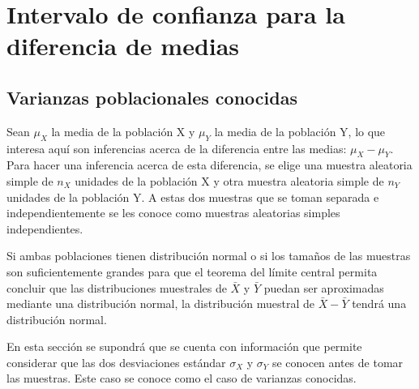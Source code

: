 \documentclass[
  11pt,
]{book}
\theoremstyle{definition}
\theoremstyle{definition}
\theoremstyle{definition}
\theoremstyle{definition}
\theoremstyle{remark}
\begin{document}
\section{Intervalo de confianza para la diferencia de medias}\label{intervalo-de-confianza-para-la-diferencia-de-medias}

\subsection{Varianzas poblacionales conocidas}\label{intervalo-de-confianza-para-la-diferencia-de-medias-varianzas-conocidas}

Sean \(\mu_X\) la media de la población X y \(\mu_Y\) la media de la población Y, lo que interesa aquí son inferencias acerca de la diferencia entre las medias: \(\mu_X - \mu_Y\). Para hacer una inferencia acerca de esta diferencia, se elige una muestra aleatoria simple de \(n_X\) unidades de la población X y otra muestra aleatoria simple de \(n_Y\) unidades de la población Y. A estas dos muestras que se toman separada e independientemente se les conoce como muestras aleatorias simples independientes.

Si ambas poblaciones tienen distribución normal o si los tamaños de las muestras son suficientemente grandes para que el teorema del límite central permita concluir
que las distribuciones muestrales de \(\bar{X}\) y \(\bar{Y}\) puedan ser aproximadas mediante una distribución normal, la distribución muestral de \(\bar{X} - \bar{Y}\) tendrá una distribución normal.

En esta sección se supondrá que se cuenta con información que permite considerar que las dos desviaciones estándar \(\sigma_X\) y \(\sigma_Y\) se conocen antes de tomar las muestras. Este caso se conoce como el caso de varianzas conocidas. \citep[página 396]{anderson}

\begin{table}[H]
\centering
\caption{\label{tab:unnamed-chunk-11}Intervalos de confianza para la diferencia de medias de dos distribucones normales y varianzas poblacionales conocidas}
\centering
{}
\end{table}
\end{document}
